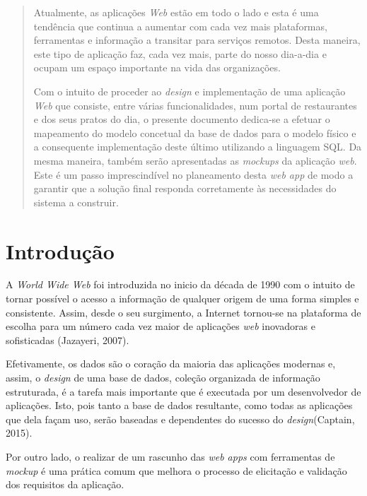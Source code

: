 \documentclass[a4paper,12pt]{report}
\begin{document}
	\begin{abstract}
	Atualmente, as aplicações \textit{Web} estão em todo o lado e esta é uma tendência que continua a aumentar com cada vez mais plataformas, ferramentas e informação a transitar para serviços remotos. Desta maneira, este tipo de aplicação faz, cada vez mais, parte do nosso dia-a-dia e ocupam um espaço importante na vida das organizações.
	
	Com o intuito de proceder ao \textit{design} e implementação de uma aplicação \textit{Web} que consiste, entre várias funcionalidades, num portal de restaurantes e dos seus pratos do dia, o presente documento dedica-se a efetuar o mapeamento do modelo concetual da base de dados para o modelo físico e a consequente implementação deste último utilizando a linguagem SQL. Da mesma maneira, também serão apresentadas as \textit{mockups} da aplicação \textit{web}. Este é um passo imprescindível no planeamento desta \textit{web app} de modo a garantir que a solução final responda corretamente às necessidades do sistema a construir.
	\end{abstract}	
	
	
	\newpage
	\tableofcontents
	
	\newpage	
	
\chapter{Introdução}	

	A \textit{World Wide Web} foi introduzida no inicio da década de 1990 com o intuito de tornar possível o acesso a informação de qualquer origem de uma forma simples e consistente. Assim, desde o seu surgimento, a Internet tornou-se na plataforma de escolha para um número cada vez maior de aplicações \textit{web} inovadoras e sofisticadas (Jazayeri, 2007).
	
	Efetivamente, os dados são o coração da maioria das aplicações modernas e, assim, o \textit{design} de uma base de dados, coleção organizada de informação estruturada, é a tarefa mais importante que é executada por um desenvolvedor de aplicações. Isto, pois tanto a base de dados resultante, como todas as aplicações que dela façam uso, serão baseadas e dependentes do sucesso do \textit{design}(Captain, 2015).
	
	Por outro lado, o realizar de um rascunho das \textit{web apps} com ferramentas de \textit{mockup} é uma prática comum que melhora o processo de elicitação e validação dos requisitos da aplicação. 
	
\end{document}
